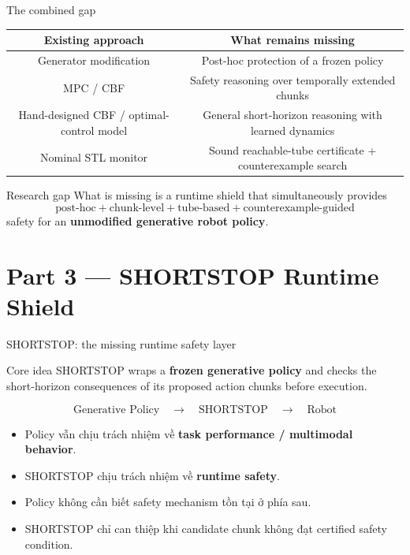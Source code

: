 \documentclass[aspectratio=169]{beamer}
\begin{document}
\begin{frame}[t,shrink=8]{The combined gap}
\begin{center}
\begin{tabular}{c|c}
\textbf{Existing approach} & \textbf{What remains missing} \\ \hline

Generator modification
& Post-hoc protection of a frozen policy \\[5pt]

MPC / CBF
& Safety reasoning over temporally extended chunks \\[5pt]

Hand-designed CBF / optimal-control model
& General short-horizon reasoning with learned dynamics \\[5pt]

Nominal STL monitor
& Sound reachable-tube certificate + counterexample search
\end{tabular}
\end{center}
\vspace{8pt}

\begin{alertblock}{Research gap}
What is missing is a runtime shield that simultaneously provides
\[
\boxed{
\text{post-hoc}
+
\text{chunk-level}
+
\text{tube-based}
+
\text{counterexample-guided}
}
\]
safety for an \textbf{unmodified generative robot policy}.
\end{alertblock}
\end{frame}

\section{Part 3 --- SHORTSTOP Runtime Shield}

\begin{frame}[t,shrink=8]{SHORTSTOP: the missing runtime safety layer}
\begin{block}{Core idea}
SHORTSTOP wraps a \textbf{frozen generative policy} and checks the
short-horizon consequences of its proposed action chunks before execution.
\end{block}
\vspace{6pt}
\begin{center}
\[\boxed{\text{Generative Policy}}\quad\longrightarrow\quad\boxed{\text{SHORTSTOP}}\quad\longrightarrow\quad\text{Robot}\]
\end{center}
\vspace{6pt}
\begin{itemize}
    \item Policy vẫn chịu trách nhiệm về \textbf{task performance / multimodal behavior}.
    \item SHORTSTOP chịu trách nhiệm về \textbf{runtime safety}.
    \item Policy không cần biết safety mechanism tồn tại ở phía sau.
    \item SHORTSTOP chỉ can thiệp khi candidate chunk không đạt certified safety condition.
\end{itemize}
\end{frame}
\end{document}
